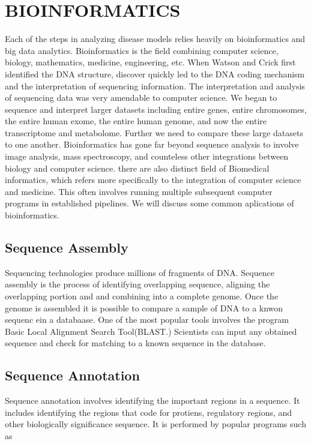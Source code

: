 \documentclass[sigconf]{acmart}
\begin{document}
\section{BIOINFORMATICS} 
Each of the steps in analyzing disease models relies heavily on bioinformatics and big data analytics.  Bioinformatics is the field combining computer science, biology, mathematics, medicine, engineering, etc. When Watson and Crick first identified the DNA structure, discover quickly led to the DNA coding mechanism and the interpretation of sequencing information.  The interpretation and analysis of sequencing data  was very amendable to computer science.  We began to sequence and interpret larger datasets including entire genes, entire chromosomes, the entire human exome, the entire human genome, and now the entire transcriptome and metabolome.  Further we need to compare these large datasets to one another.  Bioinformatics has gone far beyond sequence analysis to involve image analysis, mass spectroscopy, and counteless other integrations between biology and computer science.  there are also distinct field of Biomedical informatics, which refers more specifically to the integration of computer science and medicine. This often involves running multiple subsequent computer programs in established pipelines.  We will discuss some common aplications of bioinformatics.     

\subsection{Sequence Assembly}  
Sequencing technologies produce millions of fragments of DNA.  Sequence assembly is the process of identifying overlapping sequence, aligning the overlapping portion and and combining into a complete genome. Once the genome is assembled it is possible to compare a sample of DNA to a knwon sequenc ein a databaase.  One of the most popular tools involves the program Basic Local Alignment Search Tool(BLAST.)  Scientists can input any obtained sequence and check for matching to a known sequence in the database.        

\subsection{Sequence Annotation}  
Sequence annotation involves identifying the important regions in a sequence.  It includes identifying the regions that code for protiens, regulatory regions, and other biologically significance sequence. It is performed by popular programs such as   
\end{document}
